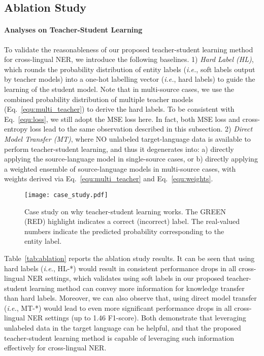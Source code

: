 \documentclass[11pt,a4paper]{article}
\newcommand\ie{\textit{i.e.}}
\begin{document}
	\subsection{Ablation Study}
	\label{sec:ablation_study}
	




	\paragraph{Analyses on Teacher-Student Learning}
	To validate the reasonableness of our proposed teacher-student learning method for cross-lingual NER, we introduce the following baselines. 
	1)  \emph{Hard Label (HL)}, which rounds the probability distribution of entity labels (\ie, soft labels output by teacher models) into a one-hot labelling vector (\ie, hard labels) to guide the learning of the student model. Note that in multi-source cases, we use the combined probability distribution of multiple teacher models (Eq.~\ref{equ:multi_teacher}) to derive the hard labels. 
	To be consistent with Eq.~\ref{equ:loss}, we still adopt the MSE loss here. In fact, both MSE loss and cross-entropy loss lead to the same observation described in this subsection.
	2) \emph{Direct Model Transfer (MT)}, where NO unlabeled target-language data is available to perform teacher-student learning, and thus it degenerates into: a) directly applying the source-language model in single-source cases, or b) directly applying a weighted ensemble of source-language models in multi-source cases, with weights derived via Eq.~\ref{equ:multi_teacher} and Eq.~\ref{equ:weights}.
	
	\begin{figure*}[t]
		\centering
		\texttt{[image: case\_study.pdf]}
		\caption{Case study on why teacher-student learning works. The \colorbox[rgb]{0.80, 0.98, 0.85}{GREEN} (\colorbox[rgb]{0.97, 0.82, 0.80}{RED}) highlight indicates a correct (incorrect) label. The real-valued numbers indicate the predicted probability corresponding to the entity label.}
		\label{fig:case_study}
	\end{figure*}

	Table~\ref{tab:ablation} reports the ablation study results. It can be seen that using hard labels (\ie, HL-*) would result in consistent performance drops in all cross-lingual NER settings, which validates using soft labels in our proposed teacher-student learning method can convey more information for knowledge transfer than hard labels. Moreover, we can also observe that, using direct model transfer (\ie, MT-*) would lead to even more significant performance drops in all cross-lingual NER settings (up to 1.46 F1-score). Both demonstrate that leveraging unlabeled data in the target language can be helpful, and that the proposed teacher-student learning method is capable of leveraging such information effectively for cross-lingual NER.
	
\end{document}
